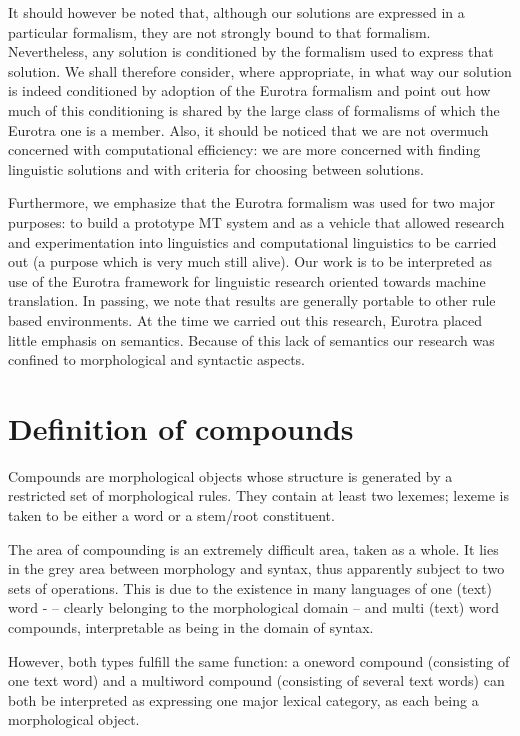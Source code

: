 It should however be noted that, although our solutions are
expressed in a particular formalism,  they are not strongly bound 
to that formalism.  Nevertheless,  any solution is conditioned by 
the  formalism used to express that solution.  We shall therefore 
consider,  where appropriate,  in what way our solution is indeed 
conditioned  by adoption of the Eurotra formalism and  point  out 
how  much  of this conditioning is shared by the large  class  of 
formalisms of which the Eurotra one is a member.  Also, it should 
be  noticed that we are not overmuch concerned with computational 
efficiency:   we  are  more  concerned  with  finding  linguistic 
solutions and with criteria for choosing between solutions.

Furthermore, we emphasize that the Eurotra formalism was used for 
two  major  purposes:  to  build a prototype MT system  and  as  a 
vehicle   that   allowed  research   and   experimentation   into 
linguistics  and  computational linguistics to be carried out  (a 
purpose  which  is  very much still alive).  Our work  is  to  be 
interpreted  as  use  of the  Eurotra  framework  for  linguistic 
research  oriented towards machine translation.  In  passing,  we
note that results are generally portable to other rule based environments.
At the time we carried out this research, Eurotra
placed  little  emphasis on semantics.  Because of this  lack  of 
semantics   our  research  was  confined  to  morphological   and 
syntactic aspects.



\section{Definition of compounds}

Compounds    are   morphological   objects  whose  structure   is 
generated  by  a  restricted set  of  morphological  rules.  They 
contain at least two lexemes; lexeme is taken to be either a word 
or a stem/root constituent.

The area of compounding is an extremely difficult area,  taken as 
a   whole.   It  lies in the grey area between   morphology   and 
syntax,  thus apparently subject to two sets of operations.  This 
is   due  to the existence in many languages of one (text)   word  
- -- clearly   belonging to the morphological domain  -- and  multi  
(text)  word compounds,  interpretable as being in the domain  of 
syntax.

However,   both  types  fulfill  the same  function:   a  oneword 
compound (consisting of one text word) and  a  multiword compound 
(consisting of several text words) can both be  interpreted  as 
expressing   one  major  lexical  category,   as  each  being   a 
morphological object. 

